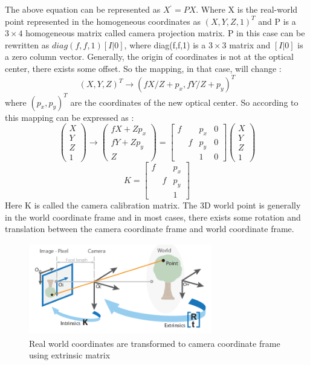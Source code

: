     
The above equation can be represented as  $X^{‘} = PX $. Where X is the real-world point represented in the homogeneous coordinates as $(X, Y, Z, 1)^{T}$ and P is a $3 \times 4$ homogeneous matrix called camera projection matrix. P in this case can be rewritten as $diag(f,f,1) [I|0]$, where diag(f,f,1) is a $3 \times 3$ matrix and $[I|0]$ is a zero column vector. 
Generally, the origin of coordinates is not at the optical center, there exists some offset. So the mapping, in that case, will change \cite{10.5555/861369}: 
\begin{equation}
(X,Y,Z)^{T} \rightarrow (fX/Z + p_{x}, fY/Z + p_{y})^{T}
\end{equation}
 where $(p_{x}, p_{y})^{T}$ are the coordinates of the new optical center. So according to this mapping can be expressed as \cite{10.5555/861369}:
   \begin{equation}
\left(\begin{array}{c}X \\ Y \\ Z \\ 1 \end{array}\right) \rightarrow \left(\begin{array}{c} fX + Zp_{x} \\ fY + Zp_{y} \\ Z \end{array}\right) = \begin{bmatrix}f & &p_{x} & 0 \\  &f &p_{y} & 0  \\   & &1 & 0   \end{bmatrix}\left(\begin{array}{c}X\\ Y  \\Z \\ 1 \end{array}\right)
\end{equation}
\begin{equation}
K =  \begin{bmatrix}f & &p_{x} \\  &f &p_{y}  \\   & &1    \end{bmatrix}
\end{equation}
 Here K is called the camera calibration matrix. The 3D world point is generally in the world coordinate frame and in most cases, there exists some rotation and translation between the camera coordinate frame and world coordinate frame.
 
    \begin{figure}[h]
    \centering
    \includegraphics[width=8cm, height =4cm]{images/camera_geo.png}
    \caption{ Real world coordinates \cite{10.5555/861369} are transformed to camera coordinate frame using extrinsic matrix }
    \end{figure}
    

